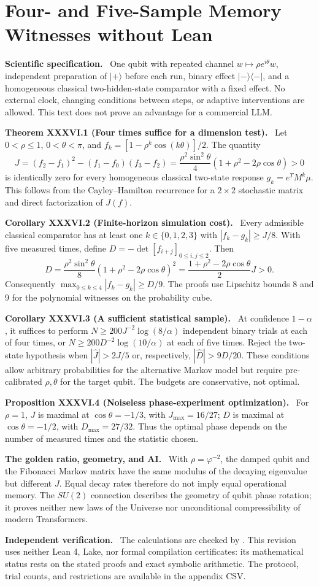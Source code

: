 \documentclass[11pt,a4paper,oneside]{book}
\newcommand{\statement}[3]{\par\medskip\noindent\textbf{#1 #2 (#3).}\ }
\newcommand{\note}[1]{\par\medskip\noindent\textbf{#1}\ }
\begin{document}
\chapter{Four- and Five-Sample Memory Witnesses without Lean}
\note{Scientific specification.} One qubit with repeated channel $w\mapsto\rho e^{i\theta}w$, independent preparation of $|+\rangle$ before each run, binary effect $|-\rangle\langle-|$, and a homogeneous classical two-hidden-state comparator with a fixed effect. No external clock, changing conditions between steps, or adaptive interventions are allowed. This text does not prove an advantage for a commercial LLM.
\statement{Theorem}{XXXVI.1}{Four times suffice for a dimension test}
Let $0<\rho\le1$, $0<\theta<\pi$, and $f_k=[1-\rho^k\cos(k\theta)]/2$. The quantity
\[J=(f_2-f_1)^2-(f_1-f_0)(f_3-f_2)=\frac{\rho^2\sin^2\theta}{4}(1+\rho^2-2\rho\cos\theta)>0\]
is identically zero for every homogeneous classical two-state response $g_k=e^TM^k\mu$. This follows from the Cayley--Hamilton recurrence for a $2\times2$ stochastic matrix and direct factorization of $J(f)$.
\statement{Corollary}{XXXVI.2}{Finite-horizon simulation cost}
Every admissible classical comparator has at least one $k\in\{0,1,2,3\}$ with $|f_k-g_k|\ge J/8$. With five measured times, define $D=-\det[f_{i+j}]_{0\le i,j\le2}$. Then
\[D=\frac{\rho^2\sin^2\theta}{8}(1+\rho^2-2\rho\cos\theta)^2=\frac{1+\rho^2-2\rho\cos\theta}{2}J>0.\]
Consequently $\max_{0\le k\le4}|f_k-g_k|\ge D/9$. The proofs use Lipschitz bounds 8 and 9 for the polynomial witnesses on the probability cube.
\statement{Corollary}{XXXVI.3}{A sufficient statistical sample}
At confidence $1-\alpha$, it suffices to perform $N\ge200J^{-2}\log(8/\alpha)$ independent binary trials at each of four times, or $N\ge200D^{-2}\log(10/\alpha)$ at each of five times. Reject the two-state hypothesis when $|\widehat J|>2J/5$ or, respectively, $|\widehat D|>9D/20$. These conditions allow arbitrary probabilities for the alternative Markov model but require pre-calibrated $\rho,\theta$ for the target qubit. The budgets are conservative, not optimal.
\statement{Proposition}{XXXVI.4}{Noiseless phase-experiment optimization}
For $\rho=1$, $J$ is maximal at $\cos\theta=-1/3$, with $J_{\max}=16/27$; $D$ is maximal at $\cos\theta=-1/2$, with $D_{\max}=27/32$. Thus the optimal phase depends on the number of measured times and the statistic chosen.
\note{The golden ratio, geometry, and AI.} With $\rho=\varphi^{-2}$, the damped qubit and the Fibonacci Markov matrix have the same modulus of the decaying eigenvalue but different $J$. Equal decay rates therefore do not imply equal operational memory. The $SU(2)$ connection describes the geometry of qubit phase rotation; it proves neither new laws of the Universe nor unconditional compressibility of modern Transformers.
\note{Independent verification.} The calculations are checked by . This revision uses neither Lean 4, Lake, nor formal compilation certificates: its mathematical status rests on the stated proofs and exact symbolic arithmetic. The protocol, trial counts, and restrictions are available in the appendix CSV.
\end{document}
